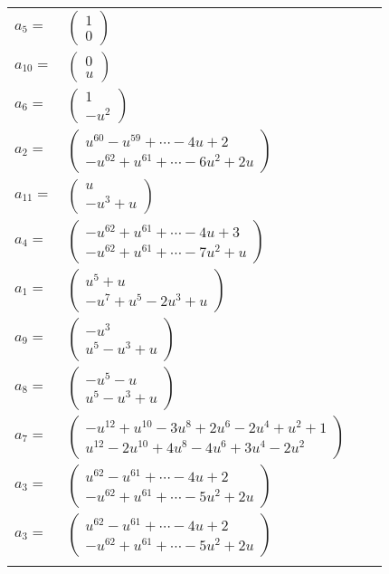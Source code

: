 \documentclass[1p]{elsarticle_modified}
\theoremstyle{definition}
\begin{document}
\begin{tabular}{m{7pt} m{180pt} m{7pt} m{180pt} }
\flushright $a_{5}=$&$\begin{pmatrix}1\\0\end{pmatrix}$ \\
\flushright $a_{10}=$&$\begin{pmatrix}0\\u\end{pmatrix}$ \\
\flushright $a_{6}=$&$\begin{pmatrix}1\\- u^2\end{pmatrix}$ \\
\flushright $a_{2}=$&$\begin{pmatrix}u^{60}- u^{59}+\cdots-4 u+2\\- u^{62}+u^{61}+\cdots-6 u^2+2 u\end{pmatrix}$ \\
\flushright $a_{11}=$&$\begin{pmatrix}u\\- u^3+u\end{pmatrix}$ \\
\flushright $a_{4}=$&$\begin{pmatrix}- u^{62}+u^{61}+\cdots-4 u+3\\- u^{62}+u^{61}+\cdots-7 u^2+u\end{pmatrix}$ \\
\flushright $a_{1}=$&$\begin{pmatrix}u^5+u\\- u^7+u^5-2 u^3+u\end{pmatrix}$ \\
\flushright $a_{9}=$&$\begin{pmatrix}- u^3\\u^5- u^3+u\end{pmatrix}$ \\
\flushright $a_{8}=$&$\begin{pmatrix}- u^5- u\\u^5- u^3+u\end{pmatrix}$ \\
\flushright $a_{7}=$&$\begin{pmatrix}- u^{12}+u^{10}-3 u^8+2 u^6-2 u^4+u^2+1\\u^{12}-2 u^{10}+4 u^8-4 u^6+3 u^4-2 u^2\end{pmatrix}$ \\
\flushright $a_{3}=$&$\begin{pmatrix}u^{62}- u^{61}+\cdots-4 u+2\\- u^{62}+u^{61}+\cdots-5 u^2+2 u\end{pmatrix}$\\ \flushright $a_{3}=$&$\begin{pmatrix}u^{62}- u^{61}+\cdots-4 u+2\\- u^{62}+u^{61}+\cdots-5 u^2+2 u\end{pmatrix}$\\&\end{tabular}
\end{document}
